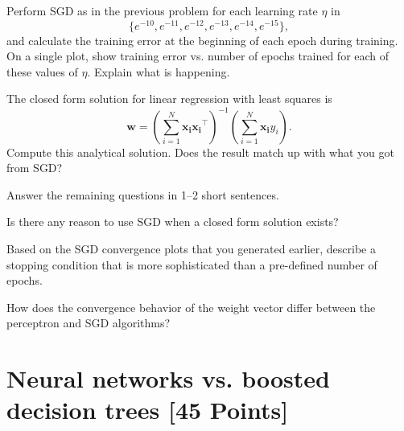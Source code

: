\begin{problem}[2]
Perform SGD as in the previous problem for each learning rate $\eta$ in \[\{e^{-10}, e^{-11}, e^{-12}, e^{-13}, e^{-14}, e^{-15}\},\] and calculate the training error at the beginning of each epoch during training.
On a single plot, show training error vs. number of epochs trained for each of these values of $\eta$.
Explain what is happening.
\end{problem}
\begin{solution}

\end{solution}


\begin{problem}[2]
The closed form solution for linear regression with least squares is \[\mathbf{w} = \left(\sum_{i=1}^N \mathbf{x_i}\mathbf{x_i}^\intercal\right)^{-1}\left(\sum_{i=1}^N \mathbf{x_i}y_i\right).\]
Compute this analytical solution.
Does the result match up with what you got from SGD?
\end{problem}
\begin{solution}

\end{solution}

Answer the remaining questions in 1--2 short sentences.

\begin{problem}[2]
Is there any reason to use SGD when a closed form solution exists?
\end{problem}
\begin{solution}

\end{solution}

\begin{problem}[2]
Based on the SGD convergence plots that you generated earlier, describe a stopping condition that is more sophisticated than a pre-defined number of epochs.
\end{problem}
\begin{solution}

\end{solution}

\begin{problem}[2]
How does the convergence behavior of the weight vector differ between the perceptron and SGD algorithms?
\end{problem}
\begin{solution}
\end{solution}


\section{Neural networks vs. boosted decision trees [45 Points]}


